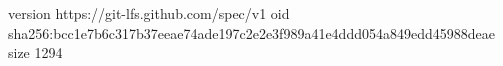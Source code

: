 version https://git-lfs.github.com/spec/v1
oid sha256:bcc1e7b6c317b37eeae74ade197c2e2e3f989a41e4ddd054a849edd45988deae
size 1294
